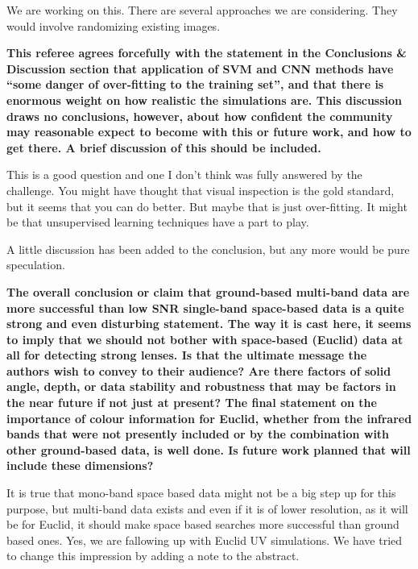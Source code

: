 \documentclass[11pt,a4paper]{article}
\begin{document}
We are working on this.  There are several approaches we are considering.  They would 
involve randomizing existing images.

{\bf
This referee agrees forcefully with the statement in the Conclusions \& Discussion section that application of SVM and CNN methods have “some danger of over-fitting to the training set”, and that there is enormous weight on how realistic the simulations are.  This discussion draws no conclusions, however, about how confident the community may reasonable expect to become with this or future work, and how to get there.  A brief discussion of this should be included.  
}

This is a good question and one I don't think was fully answered by the challenge.  You might have 
thought that visual inspection is the gold standard, but it seems that you can do better.  But maybe 
that is just over-fitting.  It might be that unsupervised learning techniques have a part to play.  

A little discussion has been added to the conclusion, but any more would be pure speculation.

{\bf
The overall conclusion or claim that ground-based multi-band data are more successful than low SNR single-band space-based data is a quite strong and even disturbing statement.  The way it is cast here, it seems to imply that we should not bother with space-based (Euclid) data at all for detecting strong lenses.  Is that the ultimate message the authors wish to convey to their audience?  Are there factors of solid angle, depth, or data stability and robustness that may be factors in the near future if not just at present?  The final statement on the importance of colour information for Euclid, whether from the infrared bands that were not presently included or by the combination with other ground-based data, is well done. Is future work planned that will include these dimensions? 
}

It is true that mono-band space based data might not be a big step up for this purpose, but 
multi-band data exists and even if it is of lower resolution, as it will be for Euclid, it should 
make space based searches more successful than ground based ones.  Yes, we are fallowing 
up with Euclid UV simulations.  We have tried to change this impression by adding a note to the abstract.
\end{document}
